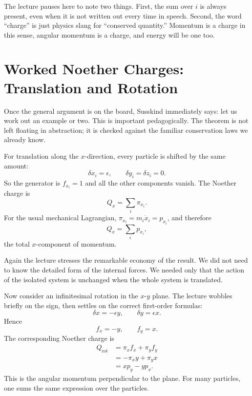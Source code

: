 The lecture pauses here to note two things. First, the sum over \(i\) is always present, even when it is not written out every time in speech. Second, the word ``charge'' is just physics slang for ``conserved quantity.'' Momentum is a charge in this sense, angular momentum is a charge, and energy will be one too.

\section{Worked Noether Charges: Translation and Rotation}

Once the general argument is on the board, Susskind immediately says: let us work out an example or two. This is important pedagogically. The theorem is not left floating in abstraction; it is checked against the familiar conservation laws we already know.

For translation along the \(x\)-direction, every particle is shifted by the same amount:
\begin{equation}
\delta x_i=\epsilon,
\qquad
\delta y_i=\delta z_i=0.
\end{equation}
So the generator is \(f_{x_i}=1\) and all the other components vanish. The Noether charge is
\begin{equation}
Q_x=\sum_i \pi_{x_i}.
\end{equation}
For the usual mechanical Lagrangian, \(\pi_{x_i}=m_i\dot x_i=p_{x_i}\), and therefore
\begin{equation}
Q_x=\sum_i p_{x_i},
\end{equation}
the total \(x\)-component of momentum.

Again the lecture stresses the remarkable economy of the result. We did not need to know the detailed form of the internal forces. We needed only that the action of the isolated system is unchanged when the whole system is translated.

Now consider an infinitesimal rotation in the \(x\)-\(y\) plane. The lecture wobbles briefly on the sign, then settles on the correct first-order formulas:
\begin{equation}
\delta x=-\epsilon y,
\qquad
\delta y=\epsilon x.
\end{equation}
Hence
\begin{equation}
f_x=-y,
\qquad
f_y=x.
\end{equation}
The corresponding Noether charge is
\begin{align}
Q_{\mathrm{rot}}
&=\pi_x f_x+\pi_y f_y \\
&=-\pi_x y+\pi_y x \\
&=xp_y-yp_x.
\end{align}
This is the angular momentum perpendicular to the plane. For many particles, one sums the same expression over the particles.

